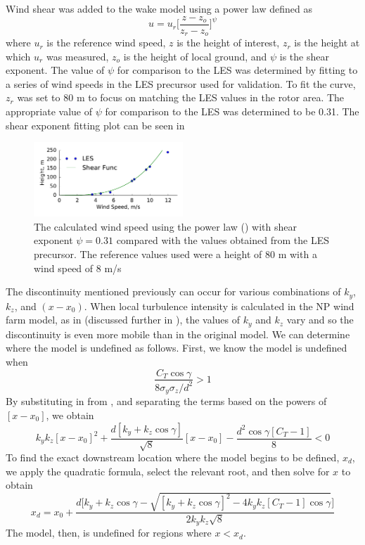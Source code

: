 \documentclass[conf]{new-aiaa}
\begin{document}
Wind shear was added to the wake model using a power law defined as
%
\begin{equation} \label{eq:shear}
	u = u_r\bigg[\frac{z-z_o}{z_r-z_o}\bigg]^\psi
\end{equation}
%
where $u_r$ is the reference wind speed, $z$ is the height of interest, $z_r$ is the height at which $u_r$ was measured, $z_o$ is the height of local ground, and $\psi$ is the shear exponent. The value of $\psi$ for comparison to the LES was determined by fitting  to a series of wind speeds in the LES precursor used for validation. To fit the curve, $z_r$ was set to 80 m to focus on matching the LES values in the rotor area. The appropriate value of $\psi$ for comparison to the LES was determined to be 0.31.
The shear exponent fitting plot can be seen in 
%
\begin{figure}[ht]
	\centering
	\includegraphics[width=0.5\textwidth]{final_images/shear_fit.pdf}
	\caption{The calculated wind speed using the power law () with shear exponent $\psi=0.31$ compared with the values obtained from the LES precursor. The reference values used were a height of 80 m with a wind speed of 8 m/s}
	\label{fig:shear_fit}
\end{figure}
%

The discontinuity mentioned previously can occur for various combinations of $k_y$, $k_z$, and $(x-x_0)$. When local turbulence intensity is calculated in the NP wind farm model, as in \cite{niayifar2016} (discussed further in ), the values of $k_y$ and $k_z$ vary and so the discontinuity is even more mobile than in the original model. We can determine where the model is undefined as follows. First, we know the model is undefined when
%
\begin{equation}
	\frac{C_T \cos{\gamma}}{8\sigma_y \sigma_z/d^2} > 1
\end{equation}
%
By substituting in from , and separating the terms based on the powers of $[x-x_0]$, we obtain
%
\begin{equation}
	k_y k_z [x-x_0]^2 + \frac{d[k_y+k_z \cos{\gamma}]}{\sqrt{8}}[x-x_0] - \frac{d^2 \cos{\gamma}[C_T -1]}{8} < 0
\end{equation}
%
To find the exact downstream location where the model begins to be defined, $x_d$, we apply the quadratic formula, select the relevant root, and then solve for $x$ to obtain
%
\begin{equation}\label{eq:xd}
	x_d = x_0 + \frac{d\Big[k_y+k_z\cos{\gamma} - \sqrt{[k_y+k_z\cos{\gamma}]^2-4k_y k_z[C_T-1]\cos{\gamma}}\Big]}{2k_y k_z\sqrt{8}}
\end{equation}
%
The model, then, is undefined for regions where $x<x_d$. 
\end{document}
